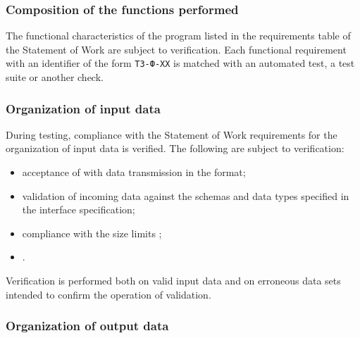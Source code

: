 \documentclass[12pt,a4paper]{extarticle}
\begin{document}
\subsubsection{Composition of the functions performed}


The functional characteristics of the program listed in the requirements table of the Statement of Work are subject to verification. Each functional requirement with an identifier of the form \texttt{ТЗ-Ф-XX} is matched with an automated test, a test suite or another check.



\clearpage

\subsubsection{Organization of input data}

\begin{hseExample}
During testing, compliance with the Statement of Work requirements for the organization of input data is verified. The following are subject to verification:

\begin{itemize}[leftmargin=1.25cm]
    \item acceptance of  with data transmission in the  format;
    \item validation of incoming data against the schemas and data types specified in the interface specification;
    \item compliance with the size limits ;
    \item {}.
\end{itemize}

Verification is performed both on valid input data and on erroneous data sets intended to confirm the operation of validation.
\end{hseExample}

\subsubsection{Organization of output data}
\end{document}
